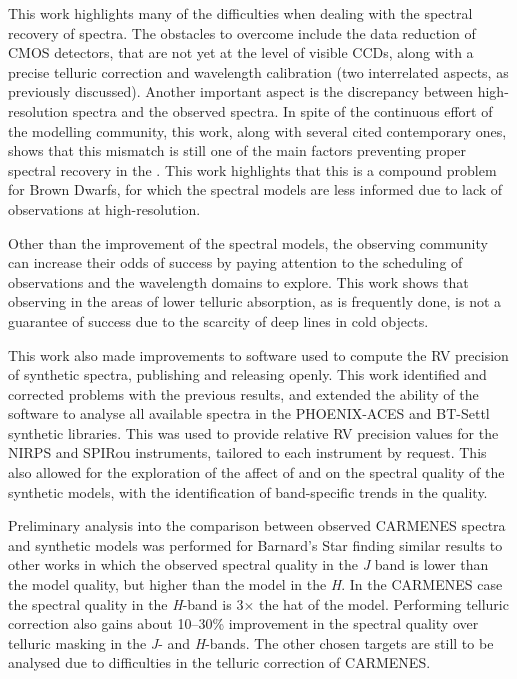 This work highlights many of the difficulties when dealing with the spectral recovery of \nir{} spectra.
The obstacles to overcome include the data reduction of \nir{} CMOS detectors, that are not yet at the level of visible CCDs, along with a precise telluric correction and wavelength calibration (two interrelated aspects, as previously discussed).
Another important aspect is the discrepancy between \nir{} high-resolution spectra and the observed spectra.
In spite of the continuous effort of the modelling community, this work, along with several cited contemporary ones, shows that this mismatch is still one of the main factors preventing proper spectral recovery in the \nir{}.
This work highlights that this is a compound problem for Brown Dwarfs, for which the spectral models are less informed due to lack of observations at high-resolution.

Other than the improvement of the spectral models, the observing community can increase their odds of success by paying attention to the scheduling of observations and the wavelength domains to explore.
This work shows that observing in the areas of lower telluric absorption, as is frequently done, is not a guarantee of success due to the scarcity of deep lines in cold objects.

This work also made improvements to software used to compute the {RV} precision of synthetic spectra, publishing and releasing \eniric{} openly.
This work identified and corrected problems with the previous results, and extended the ability of the software to analyse all available spectra in the {PHOENIX-ACES} and {BT-Settl} synthetic libraries.
This was used to provide relative {RV} precision values for the {NIRPS} and {SPIRou} instruments, tailored to each instrument by request.
This also allowed for the exploration of the affect of \Logg{} and \feh{} on the spectral quality of the synthetic models, with the identification of band-specific trends in the quality.

Preliminary analysis into the comparison between observed {CARMENES} spectra and synthetic models was performed for Barnard's Star finding similar results to other works in which the observed spectral quality in the \emph{J} band is lower than the model quality, but higher than the model in the \emph{H}.
In the CARMENES case the spectral quality in the \emph{H}-band is 3\(\times\) the hat of the model. Performing telluric correction also gains about 10--30\% improvement in the spectral quality over telluric masking in the \emph{J}- and \emph{H}-bands.
The other chosen targets are still to be analysed due to difficulties in the telluric correction of {CARMENES}.


